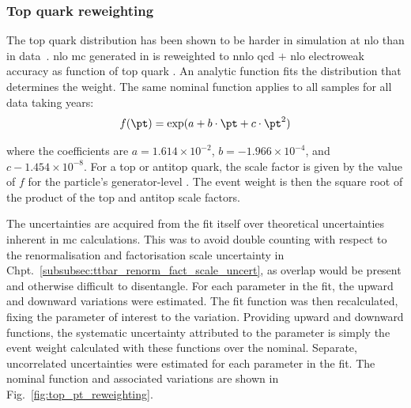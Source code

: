 

\subsubsection{Top quark \texorpdfstring{\pt}{pT} reweighting}
\label{subsubsec:htoinv_top_pt_reweighting}

The top quark \pt distribution has been shown to be harder in simulation at \acrshort{nlo} than in data~\cite{Sirunyan:2018ucr}. \acrshort{nlo} \ttbarpjets \acrshort{mc} generated in \POWHEG is reweighted to \acrshort{nnlo} \acrshort{qcd} $+$ \acrshort{nlo} electroweak accuracy as function of top quark \pt. An analytic function fits the distribution that determines the weight. The same nominal function applies to all \ttbarpjets samples for all data taking years:
\begin{equation}
    f(\pt) = \exp(a + b \cdot \pt + c \cdot \pt^2)
\end{equation}

where the coefficients are $a = \text{1.614} \times \text{10}^{-2}$, $b = -\text{1.966} \times \text{10}^{-4}$, and $c -\text{1.454} \times \text{10}^{-8}$. For a top or antitop quark, the scale factor is given by the value of $f$ for the particle's generator-level \pt. The event weight is then the square root of the product of the top and antitop scale factors.

The uncertainties are acquired from the fit itself over theoretical uncertainties inherent in \acrshort{mc} calculations. This was to avoid double counting with respect to the renormalisation and factorisation scale uncertainty in Chpt.~\ref{subsubsec:ttbar_renorm_fact_scale_uncert}, as overlap would be present and otherwise difficult to disentangle. For each parameter in the fit, the upward and downward variations were estimated. The fit function was then recalculated, fixing the parameter of interest to the variation. Providing upward and downward functions, the systematic uncertainty attributed to the parameter is simply the event weight calculated with these functions over the nominal. Separate, uncorrelated uncertainties were estimated for each parameter in the fit. The nominal function and associated variations are shown in Fig.~\ref{fig:top_pt_reweighting}.


